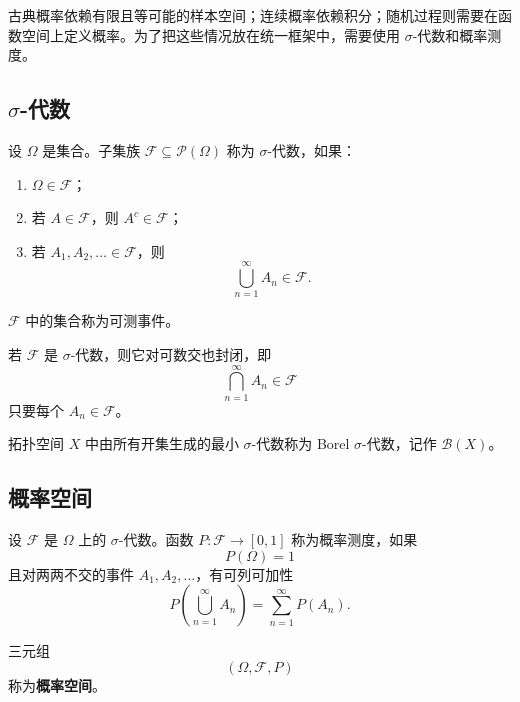 古典概率依赖有限且等可能的样本空间；连续概率依赖积分；随机过程则需要在函数空间上定义概率。为了把这些情况放在统一框架中，需要使用 $\sigma$-代数和概率测度。

\subsection{\texorpdfstring{$\sigma$}{sigma}-代数}

\begin{definition}[$\sigma$-代数]
设 $\Omega$ 是集合。子集族 $\mathcal{F}\subseteq\mathcal{P}(\Omega)$ 称为 $\sigma$-代数，如果：
\begin{enumerate}
    \item $\Omega\in\mathcal{F}$；
    \item 若 $A\in\mathcal{F}$，则 $A^c\in\mathcal{F}$；
    \item 若 $A_1,A_2,\dots\in\mathcal{F}$，则
    \[
        \bigcup_{n=1}^{\infty}A_n\in\mathcal{F}.
    \]
\end{enumerate}
$\mathcal{F}$ 中的集合称为可测事件。
\end{definition}

\begin{proposition}
若 $\mathcal{F}$ 是 $\sigma$-代数，则它对可数交也封闭，即
\[
    \bigcap_{n=1}^{\infty}A_n\in\mathcal{F}
\]
只要每个 $A_n\in\mathcal{F}$。
\end{proposition}

\begin{definition}
拓扑空间 $X$ 中由所有开集生成的最小 $\sigma$-代数称为 Borel $\sigma$-代数，记作 $\mathcal{B}(X)$。
\end{definition}

\subsection{概率空间}

\begin{definition}[概率测度]
设 $\mathcal{F}$ 是 $\Omega$ 上的 $\sigma$-代数。函数 $P:\mathcal{F}\to[0,1]$ 称为概率测度，如果
\[
    P(\Omega)=1
\]
且对两两不交的事件 $A_1,A_2,\dots$，有可列可加性
\[
    P\left(\bigcup_{n=1}^{\infty}A_n\right)=\sum_{n=1}^{\infty}P(A_n).
\]
\end{definition}

\begin{definition}[概率空间]
三元组
\[
    (\Omega,\mathcal{F},P)
\]
称为\textbf{概率空间}。
\end{definition}

